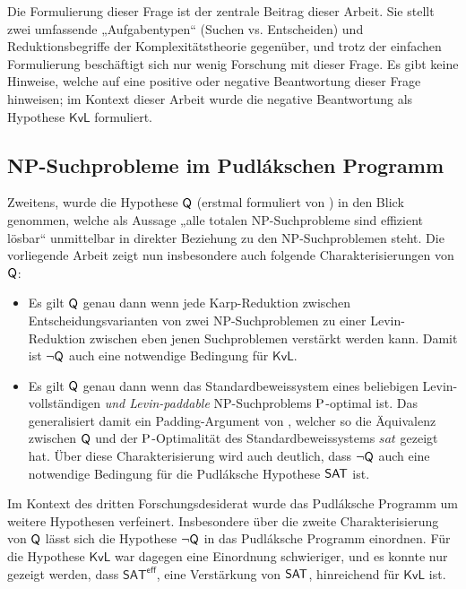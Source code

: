 Die Formulierung dieser Frage ist der zentrale Beitrag dieser Arbeit.
Sie stellt zwei umfassende „Aufgabentypen“ (Suchen vs. Entscheiden) und Reduktionsbegriffe der Komplexitätstheorie gegenüber, und trotz der einfachen Formulierung beschäftigt sich nur wenig Forschung mit dieser Frage.
Es gibt keine Hinweise, welche auf eine positive oder negative Beantwortung dieser Frage hinweisen; im Kontext dieser Arbeit wurde die negative Beantwortung als Hypothese $\mathsf{KvL}$ formuliert.



\subsection*{NP-Suchprobleme im Pudlákschen Programm}

Zweitens, wurde die Hypothese $\hQ$ (erstmal formuliert von \cite{fenner_inverting_1996}) in den Blick genommen, welche als Aussage „alle totalen NP-Suchprobleme sind effizient lösbar“ unmittelbar in direkter Beziehung zu den NP-Suchproblemen steht.
Die vorliegende Arbeit zeigt nun insbesondere auch folgende Charakterisierungen von $\hQ$:
\begin{itemize}[midpenalty=0]
    \item Es gilt $\hQ$ genau dann wenn jede Karp-Reduktion zwischen Entscheidungsvarianten von zwei NP-Suchproblemen zu einer Levin-Reduktion zwischen eben jenen Suchproblemen verstärkt werden kann. Damit ist $\neg\hQ$ auch eine notwendige Bedingung für $\mathsf{KvL}$.
    \item Es gilt $\hQ$ genau dann wenn das Standardbeweissystem eines beliebigen Levin-vollständigen \emph{und Levin-paddable} NP-Suchproblems $\P$-optimal ist. Das generalisiert damit ein Padding-Argument von \textcite{messner_simulation_2001}, welcher so die Äquivalenz zwischen $\hQ$ und der $\P$-Optimalität des Standardbeweissystems $\mathit{sat}$ gezeigt hat. Über diese Charakterisierung wird auch deutlich, dass $\neg\hQ$ auch eine notwendige Bedingung für die Pudláksche Hypothese $\hSAT$ ist.
\end{itemize}
Im Kontext des dritten Forschungsdesiderat wurde das Pudláksche Programm um weitere Hypothesen verfeinert. Insbesondere über die zweite Charakterisierung von $\hQ$ lässt sich die Hypothese $\neg\hQ$ in das Pudláksche Programm einordnen. Für die Hypothese $\mathsf{KvL}$ war dagegen eine Einordnung schwieriger, und es konnte nur gezeigt werden, dass $\mathsf{SAT^{eff}}$, eine Verstärkung von $\hSAT$, hinreichend für $\mathsf{KvL}$ ist.

